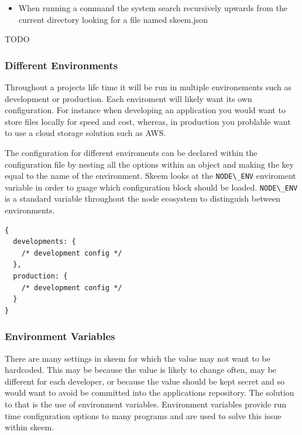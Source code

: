 \documentclass[
  12pt,
]{article}
\newcommand{\passthrough}[1]{#1}
\providecommand{\tightlist}{%
  \setlength{\itemsep}{0pt}\setlength{\parskip}{0pt}}
\begin{document}
\begin{itemize}
\tightlist
\item
  When running a command the system search recursively upwards from the
  current directory looking for a file named skeem.json
\end{itemize}

TODO

\hypertarget{different-environments}{%
\subsubsection{Different Environments}\label{different-environments}}

Throughout a projects life time it will be run in multiple environements
such as development or production. Each enviroment will likely want its
own configuration. For instance when developing an application you would
want to store files locally for speed and cost, whereas, in production
you problable want to use a cloud storage solution such as AWS.

The configuration for different enviroments can be declared within the
configuration file by nesting all the options within an object and
making the key equal to the name of the environment. Skeem looks at the
\passthrough{\lstinline!NODE\_ENV!} enviroment variable in order to
guage which configuration block should be loaded.
\passthrough{\lstinline!NODE\_ENV!} is a standard variable throughout
the node ecosystem to distinguish between environments.

\begin{lstlisting}[caption={An example of a config with multiple environments.}]
{
  developments: {
    /* development config */
  },
  production: {
    /* development config */
  }
}
\end{lstlisting}

\hypertarget{environment-variables}{%
\subsubsection{Environment Variables}\label{environment-variables}}

There are many settings in skeem for which the value may not want to be
hardcoded. This may be because the value is likely to change often, may
be different for each developer, or because the value should be kept
secret and so would want to avoid be committed into the applications
repository. The solution to that is the use of environment variables.
Environment variables provide run time configuration options to many
programs and are used to solve this issue within skeem.
\end{document}
